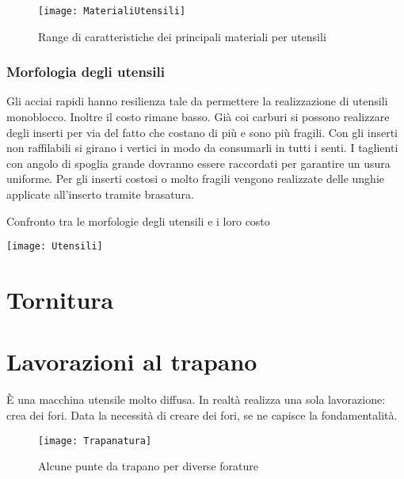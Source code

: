 \begin{figure}
\centering
\texttt{[image: MaterialiUtensili]}
\caption{Range di caratteristiche dei principali materiali per utensili}
\label{fig:MaterialiUtensili}
\end{figure}

\subsection{Morfologia degli utensili}
Gli acciai rapidi hanno resilienza tale da permettere la realizzazione di utensili monoblocco. Inoltre il costo rimane basso.
Già coi carburi si possono realizzare degli inserti per via del fatto che costano di più e sono più fragili.
Con gli inserti non raffilabili si girano i vertici in modo da consumarli in tutti i senti.
I taglienti con angolo di spoglia grande dovranno essere raccordati per garantire un usura uniforme.
Per gli inserti costosi o molto fragili vengono realizzate delle unghie applicate all'inserto tramite brasatura.

\begin{table}
\centering
\caption{Confronto tra le morfologie degli utensili e i loro costo}
\label{tab:ConfrontoUtensili}
\texttt{[image: Utensili]}
\end{table}


\chapter{Tornitura}
\newpage
\chapter{Lavorazioni al trapano}\label{chp:LavTrapano}
È una macchina utensile molto diffusa.
In realtà realizza una sola lavorazione: crea dei fori.
Data la necessità di creare dei fori, se ne capisce la fondamentalità.

\begin{figure}
\centering
\texttt{[image: Trapanatura]}
\caption{Alcune punte da trapano per diverse forature}
\label{fig:Tapanatura}
\end{figure}

